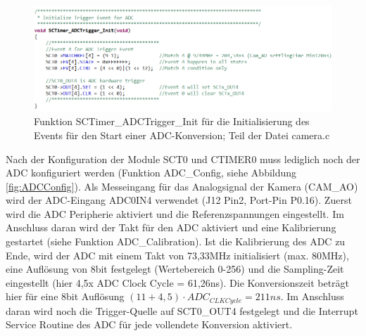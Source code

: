 \begin{figure}[H] %
\includegraphics[width=.95\textwidth]{sec7/images/code/SCTimerADCTriggerInit} 
\centering
\captionsetup{width=.95\textwidth}
\caption[Funktion \glqq{}SCTimer\_ADCTrigger\_Init\grqq{} aus der Datei \glqq{}camera.c\grqq{}]{Funktion \glqq{}SCTimer\_ADCTrigger\_Init\grqq{} für die Initialisierung des Events für den Start einer ADC-Konversion; Teil der Datei \glqq{}camera.c\grqq{}}\centering
\label{fig:SCTimerADCTriggerInit}
\end{figure}

Nach der Konfiguration der Module SCT0 und CTIMER0 muss lediglich noch der ADC konfiguriert werden (Funktion \glqq{}ADC\_Config\grqq{}, siehe Abbildung \ref{fig:ADCConfig}). Als Messeingang für das Analogsignal der Kamera (CAM\_AO) wird der ADC-Eingang ADC0IN4 verwendet (J12 Pin2, Port-Pin P0.16). Zuerst wird die ADC Peripherie aktiviert und die Referenzspannungen eingestellt. Im Anschluss daran wird der Takt für den ADC aktiviert und eine Kalibrierung gestartet (siehe Funktion \glqq{}ADC\_Calibration\grqq{}). Ist die Kalibrierung des ADC zu Ende, wird der ADC mit einem Takt von 73,33MHz initialisiert (max. 80MHz), eine Auflösung von 8bit festgelegt (Wertebereich 0-256) und die Sampling-Zeit eingestellt (hier 4,5x ADC Clock Cycle = 61,26ns). Die Konversionszeit beträgt hier für eine 8bit Auflösung $(11 + 4,5) \cdot ADC_{CLKCycle} = 211ns$. Im Anschluss daran wird noch die Trigger-Quelle auf SCT0\_OUT4 festgelegt und die Interrupt Service Routine des ADC für jede vollendete Konversion aktiviert.

